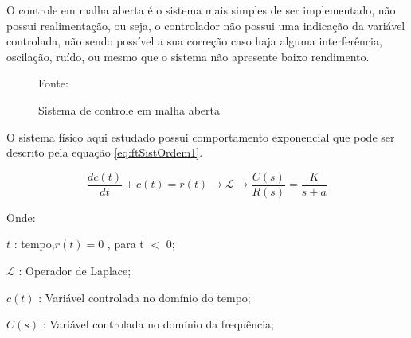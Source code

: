 O controle em malha aberta é o sistema mais simples de ser implementado, não possui realimentação, ou seja, o controlador não possui uma indicação da variável controlada, não sendo possível a sua correção caso haja alguma interferência, oscilação, ruído, ou mesmo que o sistema não apresente baixo rendimento.

\begin{figure}[!htb]
\centering
\caption{ Sistema de controle em malha aberta}
\label{fig:AcaoMalhaAberta}

{\small Fonte: \cite{Ogata}}
\end{figure}

O sistema físico aqui estudado possui comportamento exponencial que pode ser descrito pela equação \ref{eq:ftSistOrdem1}. 




\begin{equation}
	 \frac{d c(t)}{dt} + c(t) = r(t) \rightarrow  \mathscr{L} \to \frac{C(s)}{R(s)} = \frac{K}{s + a} 
\label{eq:ftSistOrdem1}
\end{equation}


Onde:

\setlength{\parindent}{2cm}

$t$ : tempo,$ r(t) = 0$ , para t $<$ 0;

$\mathscr{L}$ : Operador de Laplace;

$c(t)$ : Variável controlada no domínio do tempo;

$C(s)$ : Variável controlada no domínio da frequência;


